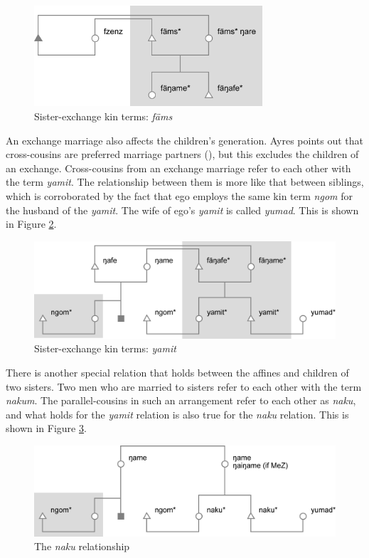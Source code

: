 \begin{figure}
  
  \includegraphics[width=8.5cm]{figures/kinship3.png}
  \caption[Sister-exchange kin terms: \emph{fäms}]{Sister-exchange kin terms: \emph{fäms}}\label{fig:kinship3}
\end{figure}

An exchange marriage also affects the children's generation. Ayres points out that cross-cousins are preferred marriage partners (\citeyear[217]{Ayres:ws}), but this excludes the children of an exchange. Cross-cousins from an exchange marriage refer to each other with the term \emph{yamit}. The relationship between them is more like that between siblings, which is corroborated by the fact that ego employs the same kin term \emph{ngom} for the husband of the \emph{yamit}. The wife of ego's \emph{yamit} is called \emph{yumad}. This is shown in Figure \ref{fig:kinship4}.

\begin{figure}
  
  \includegraphics[width=12cm]{figures/kinship4.png}
  \caption[Sister-exchange kin terms: \emph{yamit}]{Sister-exchange kin terms: \emph{yamit}}\label{fig:kinship4}
\end{figure}

There is another special relation that holds between the affines and children of two sisters. Two men who are married to sisters refer to each other with the term \emph{nakum}. The parallel-cousins in such an arrangement refer to each other as \emph{naku}, and what holds for the \emph{yamit} relation is also true for the \emph{naku} relation. This is shown in Figure \ref{fig:kinship5}.

\begin{figure}
  
  \includegraphics[width=12cm]{figures/kinship5.png}
  \caption[The \emph{naku} relationship]{The \emph{naku} relationship}\label{fig:kinship5}
\end{figure}

